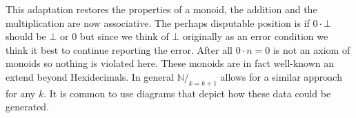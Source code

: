\documentclass[12pt,twoside,letterpaper]{memoir}
\begin{document}
\begin{center}
\end{center}
This adaptation restores the properties of a monoid, the addition and the multiplication 
are now associative.  The perhaps disputable position is if $0\cdot \bot$ should be 
$\bot$ or $0$ but since we think of $\bot$ originally as an error condition we 
think it best to continue reporting the error.  After all $0\cdot n=0$ is not an 
axiom of monoids so nothing is violated here.  These monoids are in fact 
well-known an extend beyond Hexidecimals.  In general $\mathbb{N}/_{k=k+1}$ allows 
for a similar approach for any $k$.   It is common to use diagrams that depict how these 
data could be generated.
\end{document}
